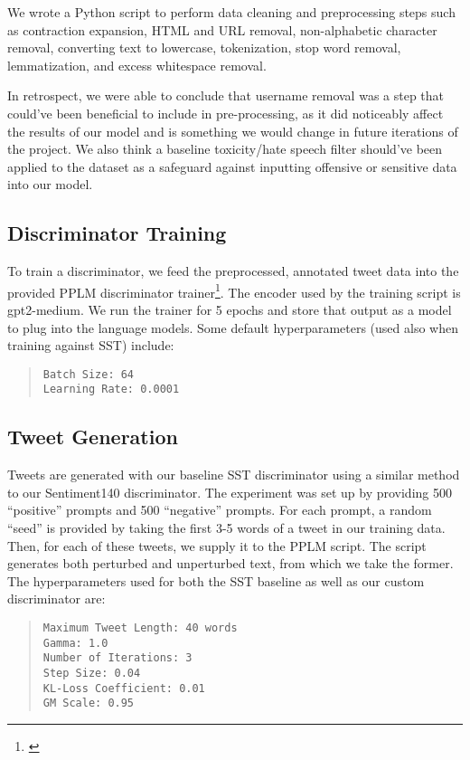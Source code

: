 \documentclass[11pt]{article}
\begin{document}
We wrote a Python script to perform data cleaning and preprocessing steps such as contraction expansion, HTML and URL removal, non-alphabetic character removal, converting text to lowercase, tokenization, stop word removal, lemmatization, and excess whitespace removal. 

In retrospect, we were able to conclude that username removal was a step that could’ve been beneficial to include in pre-processing, as it did noticeably affect the results of our model and is something we would change in future iterations of the project. We also think a baseline toxicity/hate speech filter should’ve been applied to the dataset as a safeguard against inputting offensive or sensitive data into our model. 

\subsection{Discriminator Training}
To train a discriminator, we feed the preprocessed, annotated tweet data into the provided PPLM discriminator trainer\footnote{\citep{pplm-git}}.  The encoder used by the training script is gpt2-medium.  We run the trainer for 5 epochs and store that output as a model to plug into the language models.  Some default hyperparameters (used also when training against SST) include:
\begin{quote}
\begin{verbatim}
Batch Size: 64
Learning Rate: 0.0001
\end{verbatim}
\end{quote}

\subsection{Tweet Generation}
Tweets are generated with our baseline SST discriminator using a similar method to our Sentiment140 discriminator. The experiment was set up by providing 500 “positive” prompts and 500 “negative” prompts.  For each prompt, a random “seed” is provided by taking the first 3-5 words of a tweet in our training data.  Then, for each of these tweets, we supply it to the PPLM script. The script generates both perturbed and unperturbed text, from which we take the former. The hyperparameters used for both the SST baseline as well as our custom discriminator are:
\begin{quote}
\begin{verbatim}
Maximum Tweet Length: 40 words
Gamma: 1.0
Number of Iterations: 3
Step Size: 0.04
KL-Loss Coefficient: 0.01
GM Scale: 0.95
\end{verbatim}
\end{quote}
\end{document}
